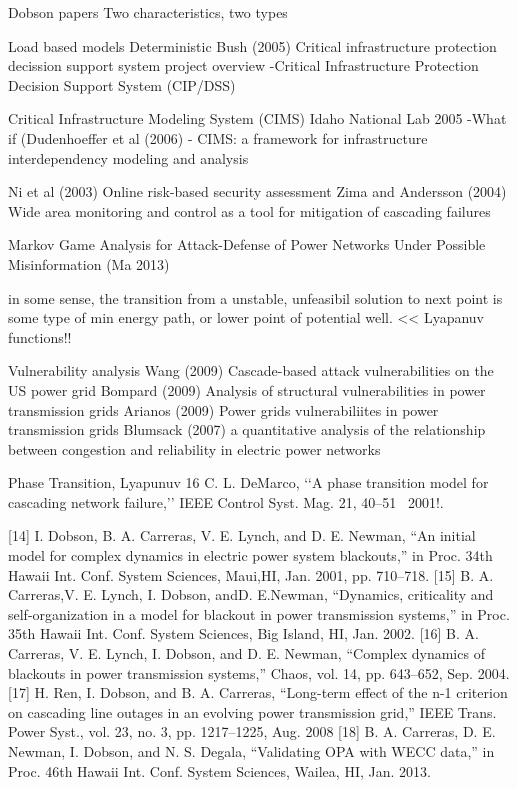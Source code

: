 Dobson papers
Two  characteristics, two types

Load based models
Deterministic
Bush (2005) Critical infrastructure protection decission support system project overview
-Critical Infrastructure Protection Decision Support System (CIP/DSS)

Critical Infrastructure Modeling System (CIMS) Idaho National Lab 2005
-What if (Dudenhoeffer et al (2006) - CIMS: a framework for infrastructure interdependency modeling and analysis

Ni et al (2003) Online risk-based security assessment
Zima and Andersson (2004) Wide area monitoring and control as a tool for mitigation of cascading failures


Markov Game Analysis for Attack-Defense of Power Networks Under Possible Misinformation (Ma 2013) \cite{ma_2013}


in some sense, the transition from a unstable, unfeasibil solution to next point is some type of min energy path, or lower point of potential well.  << Lyapanuv functions!!

Vulnerability analysis
Wang (2009) Cascade-based attack vulnerabilities on the US power grid
Bompard (2009) Analysis of structural vulnerabilities in power transmission grids
Arianos (2009) Power grids vulnerabiliites in power transmission grids
Blumsack (2007) a quantitative analysis of the relationship between congestion and reliability in electric power networks


Phase Transition, Lyapunuv
16 C. L. DeMarco, ‘‘A phase transition model for cascading network failure,’’
IEEE Control Syst. Mag. 21, 40–51 ~2001!.


[14] I. Dobson, B. A. Carreras, V. E. Lynch, and D. E. Newman, “An initial
model for complex dynamics in electric power system blackouts,” in
Proc. 34th Hawaii Int. Conf. System Sciences, Maui,HI, Jan. 2001, pp.
710–718.
[15] B. A. Carreras,V. E. Lynch, I. Dobson, andD. E.Newman, “Dynamics,
criticality and self-organization in a model for blackout in power transmission
systems,” in Proc. 35th Hawaii Int. Conf. System Sciences, Big
Island, HI, Jan. 2002.
[16] B. A. Carreras, V. E. Lynch, I. Dobson, and D. E. Newman, “Complex
dynamics of blackouts in power transmission systems,” Chaos, vol. 14,
pp. 643–652, Sep. 2004.
[17] H. Ren, I. Dobson, and B. A. Carreras, “Long-term effect of the n-1
criterion on cascading line outages in an evolving power transmission
grid,” IEEE Trans. Power Syst., vol. 23, no. 3, pp. 1217–1225, Aug.
2008
[18] B. A. Carreras, D. E. Newman, I. Dobson, and N. S. Degala, “Validating
OPA with WECC data,” in Proc. 46th Hawaii Int. Conf. System
Sciences, Wailea, HI, Jan. 2013.

